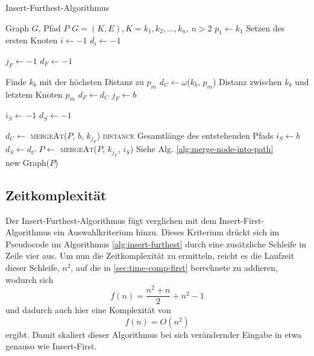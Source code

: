 \begin{algorithm}[H]
    \caption{Insert-Furthest-Algorithmus}
    \label{alg:insert-furthest}
    \begin{algorithmic}[1]
        \Require Graph $G$, Pfad $P$ 
        \Require $G=(K,E),K= k_1,k_2,\ldots,k_n$, $n > 2$ 
        \State $p_1 \gets k_1$
        \Comment Setzen des ersten Knoten
        \State $i \gets -1$
        \State $d_i \gets -1$

            \State $j_F \gets -1$
            \State $d_F \gets -1$

                \Comment Finde $k_b$ mit der höchsten Distanz zu $p_m$
                \State $d_C \gets \omega$($k_b$, $p_m$)
                \Comment Distanz zwischen $k_b$ und letztem Knoten $p_m$
                    \State $d_F \gets d_C$
                    \State $j_F \gets b$
                \EndIf
            \EndFor

            \State $i_S \gets -1$
            \State $d_S \gets -1$

                \State $d_C \gets$ \textsc{mergeAt}($P$, $b$, $k_{j_F}$) \textsc{distance}
                \Comment Gesamtlänge des entstehenden Pfads
                    \State $i_S \gets b$
                    \State $d_S \gets d_C$
                \EndIf
            \EndFor
            \State $P \gets$ \textsc{mergeAt}($P$, $k_{j_F}$, $i_S$)
            \Comment Siehe Alg. \vref{alg:merge-node-into-path}
        \EndFor \\
        \Return new Graph($P$)
    \end{algorithmic}
\end{algorithm}

\subsection{Zeitkomplexität}
Der Insert-Furthest-Algorithmus fügt verglichen mit dem Insert-First-Algorithmus ein Auswahlkriterium hinzu.
Dieses Kriterium drückt sich im Pseudocode im Algorithmus \vref{alg:insert-furthest} durch eine zusätzliche Schleife in Zeile vier aus.
Um nun die Zeitkomplexität zu ermitteln, reicht es die Laufzeit dieser Schleife, $n^2$, auf die in \vref{sec:time-comp-first} berechnete zu addieren, wodurch sich 
$$f(n) = \frac{n^2+n}{2}+n^2 -1$$
und dadurch auch hier eine Komplexität von
$$f(n) = O(n^2)$$
ergibt.
Damit skaliert dieser Algorithmus bei sich verändernder Eingabe in etwa genauso wie Insert-First.

